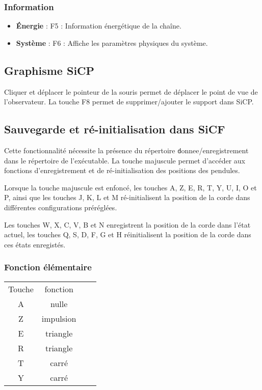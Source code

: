\subsubsection{Information}
\begin{itemize}[label=, leftmargin=2cm, itemsep=0pt]
\item {\bf Énergie} : {\sf F5} : Information énergétique de la chaîne.
\item {\bf Système} : {\sf F6} : Affiche les paramètres physiques du système.
\end{itemize}
%
\subsection{Graphisme SiCP}
Cliquer et déplacer le pointeur de la souris permet de déplacer le point de vue de l'observateur. La touche {\sf F8} permet de supprimer/ajouter le support dans SiCP.
%
\subsection{Sauvegarde et ré-initialisation dans SiCF}
%
Cette fonctionnalité nécessite la présence du répertoire {\texttt donnee/enregistrement} dans le répertoire de l'exécutable.
La touche majuscule permet d'accéder aux fonctions d'enregistrement et de ré-initialisation des positions des pendules.

Lorsque la touche majuscule est enfoncé, les touches {\sf A}, {\sf Z}, {\sf E}, {\sf R}, {\sf T}, {\sf Y}, {\sf U}, {\sf I}, {\sf O} et {\sf P}, ainsi que les touches {\sf J}, {\sf K}, {\sf L} et {\sf M} ré-initialisent la position de la corde dans différentes configurations préréglées.

Les touches {\sf W}, {\sf X}, {\sf C}, {\sf V}, {\sf B} et {\sf N} enregistrent la position de la corde dans l'état actuel, les touches {\sf Q}, {\sf S}, {\sf D}, {\sf F}, {\sf G} et {\sf H} réinitialisent la position de la corde dans ces états enregistés.
%
\subsubsection{Fonction élémentaire}
%
\begin{center}
\begin{tabular}{cc cc}%
Touche & fonction \\
A & nulle &\\
Z & impulsion &\\
E & triangle&\\
R & triangle&\\
T & carré &\\
Y & carré &\\
\end{tabular}
\end{center}
%
